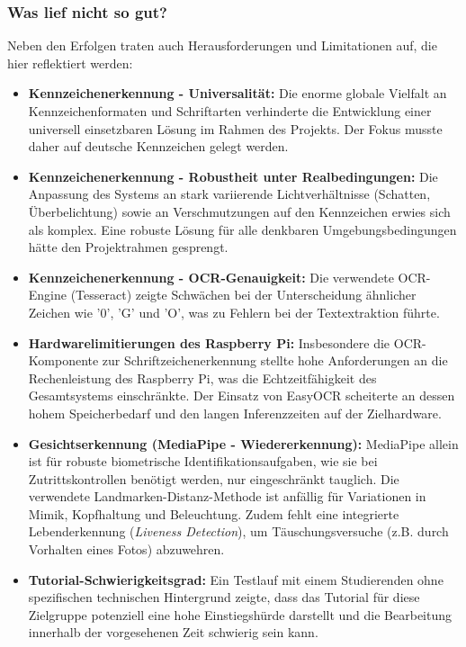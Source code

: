 \subsubsection{Was lief nicht so gut?}
Neben den Erfolgen traten auch Herausforderungen und Limitationen auf, die hier reflektiert werden:
\begin{itemize}
    \item \textbf{Kennzeichenerkennung - Universalität:} Die enorme globale Vielfalt an Kennzeichenformaten und Schriftarten verhinderte die Entwicklung einer universell einsetzbaren Lösung im Rahmen des Projekts. Der Fokus musste daher auf deutsche Kennzeichen gelegt werden.
    \item \textbf{Kennzeichenerkennung - Robustheit unter Realbedingungen:} Die Anpassung des Systems an stark variierende Lichtverhältnisse (Schatten, Überbelichtung) sowie an Verschmutzungen auf den Kennzeichen erwies sich als komplex. Eine robuste Lösung für alle denkbaren Umgebungsbedingungen hätte den Projektrahmen gesprengt.
    \item \textbf{Kennzeichenerkennung - OCR-Genauigkeit:} Die verwendete OCR-Engine (Tesseract) zeigte Schwächen bei der Unterscheidung ähnlicher Zeichen wie '0', 'G' und 'O', was zu Fehlern bei der Textextraktion führte.
    \item \textbf{Hardwarelimitierungen des Raspberry Pi:} Insbesondere die OCR-Komponente zur Schriftzeichenerkennung stellte hohe Anforderungen an die Rechenleistung des Raspberry Pi, was die Echtzeitfähigkeit des Gesamtsystems einschränkte. Der Einsatz von EasyOCR scheiterte an dessen hohem Speicherbedarf und den langen Inferenzzeiten auf der Zielhardware.
    \item \textbf{Gesichtserkennung (MediaPipe - Wiedererkennung):} MediaPipe allein ist für robuste biometrische Identifikationsaufgaben, wie sie bei Zutrittskontrollen benötigt werden, nur eingeschränkt tauglich. Die verwendete Landmarken-Distanz-Methode ist anfällig für Variationen in Mimik, Kopfhaltung und Beleuchtung. Zudem fehlt eine integrierte Lebenderkennung (\textit{Liveness Detection}), um Täuschungsversuche (z.B. durch Vorhalten eines Fotos) abzuwehren.
    \item \textbf{Tutorial-Schwierigkeitsgrad:} Ein Testlauf mit einem Studierenden ohne spezifischen technischen Hintergrund zeigte, dass das Tutorial für diese Zielgruppe potenziell eine hohe Einstiegshürde darstellt und die Bearbeitung innerhalb der vorgesehenen Zeit schwierig sein kann.
\end{itemize}
